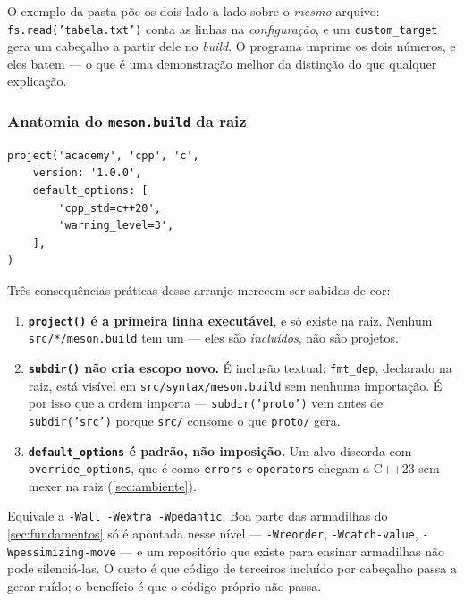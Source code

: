 O exemplo da pasta põe os dois lado a lado sobre o \emph{mesmo} arquivo:
\texttt{fs.read('tabela.txt')} conta as linhas na \emph{configuração}, e um
\texttt{custom\_target} gera um cabeçalho a partir dele no \emph{build}. O
programa imprime os dois números, e eles batem --- o que é uma demonstração
melhor da distinção do que qualquer explicação.

\subsubsection{Anatomia do \texttt{meson.build} da raiz}

\begin{lstlisting}[style=bt, language=Meson,
    caption={As primeiras linhas de \texttt{meson.build}, na raiz do repositório.}]
project('academy', 'cpp', 'c',
    version: '1.0.0',
    default_options: [
        'cpp_std=c++20',
        'warning_level=3',
    ],
)
\end{lstlisting}

Três consequências práticas desse arranjo merecem ser sabidas de cor:

\begin{enumerate}
    \item \textbf{\texttt{project()} é a primeira linha executável}, e só existe
          na raiz. Nenhum \texttt{src/*/meson.build} tem um --- eles são
          \emph{incluídos}, não são projetos.
    \item \textbf{\texttt{subdir()} não cria escopo novo.} É inclusão textual:
          \texttt{fmt\_dep}, declarado na raiz, está visível em
          \texttt{src/syntax/meson.build} sem nenhuma importação. É por isso que
          a ordem importa --- \texttt{subdir('proto')} vem antes de
          \texttt{subdir('src')} porque \texttt{src/} consome o que
          \texttt{proto/} gera.
    \item \textbf{\texttt{default\_options} é padrão, não imposição.} Um alvo
          discorda com \texttt{override\_options}, que é como \texttt{errors} e
          \texttt{operators} chegam a C++23 sem mexer na raiz
          (\cref{sec:ambiente}).
\end{enumerate}

\begin{porque}[\texttt{warning\_level=3} é uma decisão didática]
Equivale a \texttt{-Wall -Wextra -Wpedantic}. Boa parte das armadilhas do
\cref{sec:fundamentos} só é apontada nesse nível --- \texttt{-Wreorder},
\texttt{-Wcatch-value}, \texttt{-Wpessimizing-move} --- e um repositório que
existe para ensinar armadilhas não pode silenciá-las. O custo é que código de
terceiros incluído por cabeçalho passa a gerar ruído; o benefício é que o
código próprio não passa.
\end{porque}

